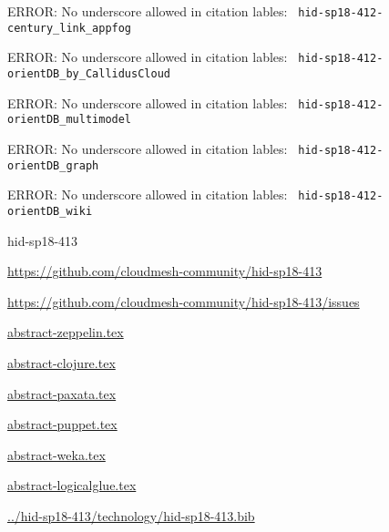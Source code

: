 \begin{IU}
 ERROR: No underscore allowed in citation lables: \verb| hid-sp18-412-century_link_appfog |

 ERROR: No underscore allowed in citation lables: \verb| hid-sp18-412-orientDB_by_CallidusCloud |

 ERROR: No underscore allowed in citation lables: \verb| hid-sp18-412-orientDB_multimodel |

 ERROR: No underscore allowed in citation lables: \verb| hid-sp18-412-orientDB_graph |

 ERROR: No underscore allowed in citation lables: \verb| hid-sp18-412-orientDB_wiki |

\end{IU}


\begin{IU}

hid-sp18-413

\url{https://github.com/cloudmesh-community/hid-sp18-413}

\url{https://github.com/cloudmesh-community/hid-sp18-413/issues}

\href{https://github.com/cloudmesh-community/hid-sp18-413/blob/master//technology/abstract-zeppelin.tex}{abstract-zeppelin.tex}

\href{https://github.com/cloudmesh-community/hid-sp18-413/blob/master//technology/abstract-clojure.tex}{abstract-clojure.tex}

\href{https://github.com/cloudmesh-community/hid-sp18-413/blob/master//technology/abstract-paxata.tex}{abstract-paxata.tex}

\href{https://github.com/cloudmesh-community/hid-sp18-413/blob/master//technology/abstract-puppet.tex}{abstract-puppet.tex}

\href{https://github.com/cloudmesh-community/hid-sp18-413/blob/master//technology/abstract-weka.tex}{abstract-weka.tex}

\href{https://github.com/cloudmesh-community/hid-sp18-413/blob/master//technology/abstract-logicalglue.tex}{abstract-logicalglue.tex}

\href{https://github.com/cloudmesh-community/hid-sp18-413/blob/master//technology/hid-sp18-413.bib}{../hid-sp18-413/technology/hid-sp18-413.bib}

\end{IU}


